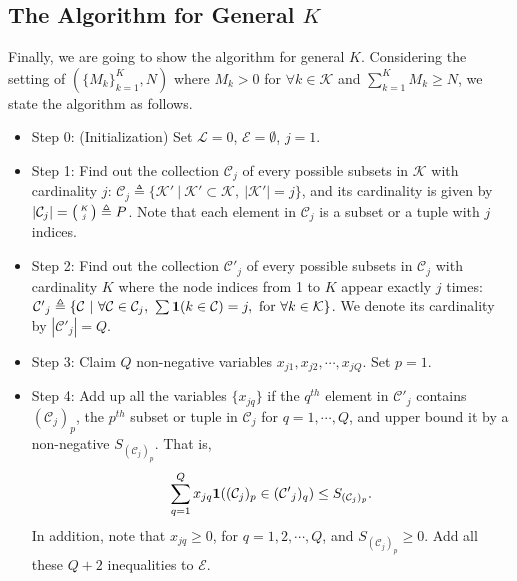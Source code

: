 \documentclass[conference]{IEEEtran}
\begin{document}
\subsection{The Algorithm for General $K$}

Finally, we are going to show the algorithm for general $K$. Considering the setting of $(\{M_k\}_{k=1}^K,N)$ where $M_k>0$ for $\forall k\in \mathcal{K}$ and $\sum_{k=1}^K M_k\geq N$, we state the algorithm as follows.

\begin{itemize}
\item{Step 0:} (Initialization) Set $\mathcal{L}=0$, $\mathcal{E}=\emptyset$, $j=1$.

\item{Step 1:} Find out the collection $\mathcal{C}_j$ of every possible subsets in $\mathcal{K}$ with cardinality $j$: $\mathcal{C}_j\triangleq \{\mathcal{K'}~|~\mathcal{K'}\subset \mathcal{K},~|\mathcal{K'}|=j\}$, and its cardinality is given by $|\mathcal{C}_j|=\big(\!\!\begin{tiny}\begin{array}{c}K\\j\end{array}\end{tiny}\!\!\big)\triangleq P$. Note that each element in $\mathcal{C}_j$ is a subset or a tuple with $j$ indices.

\item{Step 2:} Find out the collection $\mathcal{C'}_j$ of every possible subsets in $\mathcal{C}_j$ with cardinality $K$ where the node indices from 1 to $K$ appear exactly $j$ times: $\mathcal{C'}_j\triangleq \{\mathcal{C}~|~\forall \mathcal{C}\in \mathcal{C}_j,~\sum {\bf 1}(k\in \mathcal{C})=j,~\textrm{for}~\forall k\in\mathcal{K}\}$. We denote its cardinality by $|\mathcal{C'}_j|=Q$.

\item{Step 3:} Claim $Q$ non-negative variables $x_{j1},x_{j2},\cdots,x_{jQ}$. Set $p=1$.

\item{Step 4:} Add up all the variables $\{x_{jq}\}$ if the $q^{th}$ element in $\mathcal{C'}_j$ contains $(\mathcal{C}_j)_p$, the $p^{th}$ subset or tuple in $\mathcal{C}_j$ for $q=1,\cdots,Q$, and upper bound it by a non-negative $S_{(\mathcal{C}_j)_p}$. That is,
\begin{eqnarray*}
\sum_{q=1}^Q x_{jq}{\bf 1}((\mathcal{C}_j)_p\in(\mathcal{C'}_j)_q)\leq S_{(\mathcal{C}_j)_p}.
\end{eqnarray*}
In addition, note that $x_{jq}\geq 0$, for $q=1,2,\cdots,Q$, and $S_{(\mathcal{C}_j)_p}\geq 0$. Add all these $Q+2$ inequalities to $\mathcal{E}$.


\end{itemize}
\end{document}
